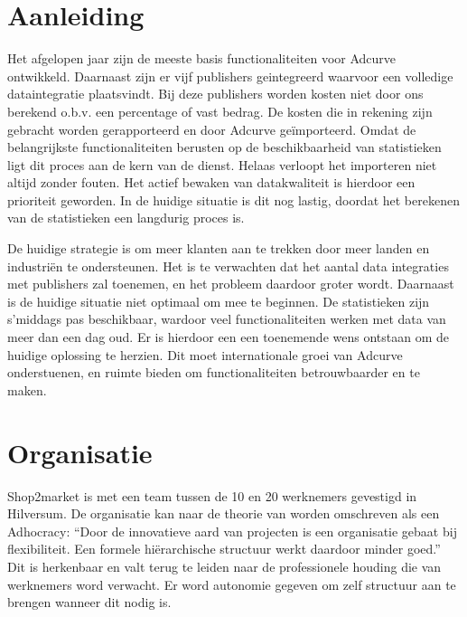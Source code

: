 \pagebreak

\section{Aanleiding} %

Het afgelopen jaar zijn de meeste basis functionaliteiten voor Adcurve ontwikkeld. Daarnaast zijn er vijf publishers geintegreerd waarvoor een volledige dataintegratie plaatsvindt. Bij deze publishers worden kosten niet door ons berekend o.b.v. een percentage of vast bedrag. De kosten die in rekening zijn gebracht worden gerapporteerd en door Adcurve geïmporteerd.
Omdat de belangrijkste functionaliteiten berusten op de beschikbaarheid van statistieken ligt dit proces aan de kern van de dienst. Helaas verloopt het importeren niet altijd zonder fouten. Het actief bewaken van datakwaliteit is hierdoor een prioriteit geworden. In de huidige situatie is dit nog lastig, doordat het berekenen van de statistieken een langdurig proces is.

De huidige strategie is om meer klanten aan te trekken door meer landen en industriën te ondersteunen. Het is te verwachten dat het aantal data integraties met publishers zal toenemen, en het probleem daardoor groter wordt. Daarnaast is de huidige situatie niet optimaal om mee te beginnen. De statistieken zijn s'middags pas beschikbaar, wardoor veel functionaliteiten werken met data van meer dan een dag oud. Er is hierdoor een een toenemende wens ontstaan om de huidige oplossing te herzien. Dit moet internationale groei van Adcurve onderstuenen, en ruimte bieden om functionaliteiten betrouwbaarder en te maken.

\section{Organisatie} %

Shop2market is met een team tussen de 10 en 20 werknemers gevestigd in Hilversum. De organisatie kan naar de theorie van
\autocite{mintzberg} worden omschreven als een Adhocracy: “Door de innovatieve aard van projecten is een organisatie gebaat bij flexibiliteit. Een formele hiërarchische structuur werkt daardoor minder goed.” Dit is herkenbaar en valt terug te leiden naar de professionele houding die van werknemers word verwacht. Er word autonomie gegeven om zelf structuur aan te brengen wanneer dit nodig is.

